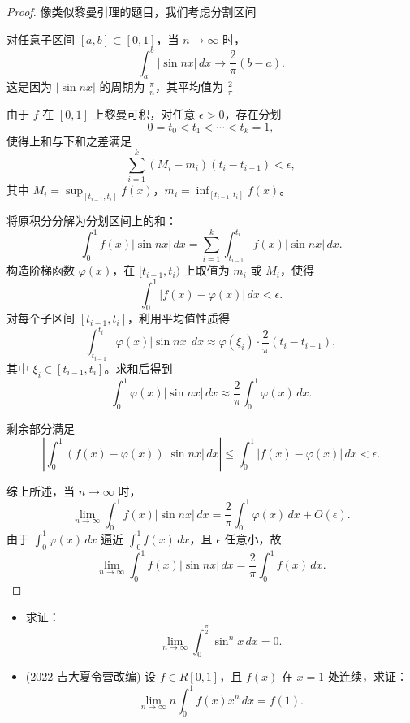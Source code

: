 \documentclass[lang=cn,10pt,thmcnt=section]{elegantbook}
\begin{document}
\begin{proof}
	像类似黎曼引理的题目，我们考虑分割区间
 
对任意子区间 \([a, b] \subset [0, 1]\)，当 \( n \to \infty \) 时，
\[
\int_a^b |\sin nx| \, dx \to \frac{2}{\pi} (b - a).
\]
这是因为 \( |\sin nx| \) 的周期为 \( \frac{\pi}{n} \)，其平均值为 \(\frac{2}{\pi}\)

由于 \( f \) 在 \([0,1]\) 上黎曼可积，对任意 \(\epsilon > 0\)，存在分划
\[
0 = t_0 < t_1 < \cdots < t_k = 1,
\]
使得上和与下和之差满足
\[
\sum_{i=1}^k \left( M_i - m_i \right)(t_i - t_{i-1}) < \epsilon,
\]
其中 \( M_i = \sup_{[t_{i-1}, t_i]} f(x) \)，\( m_i = \inf_{[t_{i-1}, t_i]} f(x) \)。

将原积分分解为分划区间上的和：
\[
\int_0^1 f(x) |\sin nx| \, dx = \sum_{i=1}^k \int_{t_{i-1}}^{t_i} f(x) |\sin nx| \, dx.
\]
构造阶梯函数 \( \varphi(x) \)，在 \([t_{i-1}, t_i)\) 上取值为 \( m_i \) 或 \( M_i \)，使得
\[
\int_0^1 |f(x) - \varphi(x)| \, dx < \epsilon.
\]
对每个子区间 \([t_{i-1}, t_i]\)，利用平均值性质得
\[
\int_{t_{i-1}}^{t_i} \varphi(x) |\sin nx| \, dx \approx \varphi(\xi_i) \cdot \frac{2}{\pi} (t_i - t_{i-1}),
\]
其中 \( \xi_i \in [t_{i-1}, t_i] \)。求和后得到
\[
\int_0^1 \varphi(x) |\sin nx| \, dx \approx \frac{2}{\pi} \int_0^1 \varphi(x) \, dx.
\]

剩余部分满足
\[
\left| \int_0^1 (f(x) - \varphi(x)) |\sin nx| \, dx \right| \leq \int_0^1 |f(x) - \varphi(x)| \, dx < \epsilon.
\]

综上所述，当 \( n \to \infty \) 时，
\[
\lim_{n \to \infty} \int_0^1 f(x) |\sin nx| \, dx = \frac{2}{\pi} \int_0^1 \varphi(x) \, dx + O(\epsilon).
\]
由于 \( \int_0^1 \varphi(x) \, dx \) 逼近 \( \int_0^1 f(x) \, dx \)，且 \(\epsilon\) 任意小，故
\[
\lim_{n \to \infty} \int_0^1 f(x) |\sin nx| \, dx = \frac{2}{\pi} \int_0^1 f(x) \, dx.
\]
\end{proof}
\begin{example}
	\begin{itemize}
		\item 求证：
		\[
		\lim_{n \to \infty} \int_0^{\frac{\pi}{2}} \sin^n x \, dx = 0.
		\]
		
		\item (2022 吉大夏令营改编) 设 $f \in R[0,1]$，且 $f(x)$ 在 $x=1$ 处连续，求证：
		\[
		\lim_{n \to \infty} n \int_0^1 f(x) x^n \, dx = f(1).
		\]
	\end{itemize}
\end{example}
\end{document}

